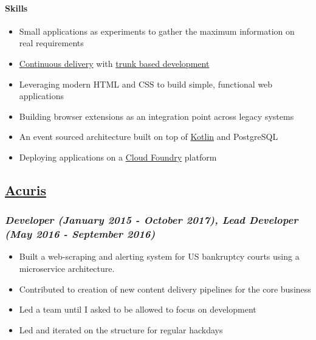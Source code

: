 \hypertarget{skills}{%
\paragraph{Skills}\label{skills}}

\begin{itemize}
\tightlist
\item
  Small applications as experiments to gather the maximum information on
  real requirements
\item
  \href{https://continuousdelivery.com/}{Continuous delivery} with
  \href{https://trunkbaseddevelopment.com/}{trunk based development}
\item
  Leveraging modern HTML and CSS to build simple, functional web
  applications
\item
  Building browser extensions as an integration point across legacy
  systems
\item
  An event sourced architecture built on top of
  \href{https://kotlinlang.org/}{Kotlin} and PostgreSQL
\item
  Deploying applications on a \href{https://www.cloudfoundry.org/}{Cloud
  Foundry} platform
\end{itemize}

\hypertarget{acuris-1}{%
\subsection{\texorpdfstring{\href{http://www.acuris.com/}{Acuris}}{Acuris}}\label{acuris-1}}

\hypertarget{developer-january-2015---october-2017-lead-developer-may-2016---september-2016}{%
\subsubsection{\texorpdfstring{\emph{Developer (January 2015 - October
2017), Lead Developer (May 2016 - September
2016)}}{Developer (January 2015 - October 2017), Lead Developer (May 2016 - September 2016)}}\label{developer-january-2015---october-2017-lead-developer-may-2016---september-2016}}

\begin{itemize}
\tightlist
\item
  Built a web-scraping and alerting system for US bankruptcy courts
  using a microservice architecture.
\item
  Contributed to creation of new content delivery pipelines for the core
  business
\item
  Led a team until I asked to be allowed to focus on development
\item
  Led and iterated on the structure for regular hackdays
\end{itemize}

